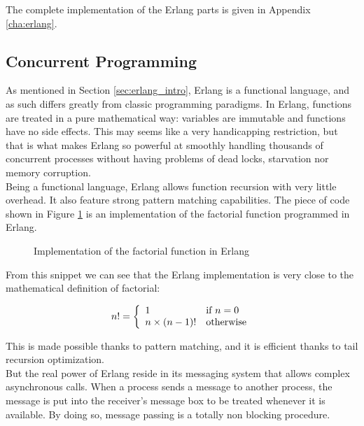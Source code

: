 The complete implementation of the Erlang parts is given in Appendix \ref{cha:erlang}.

\subsection{Concurrent Programming}

As mentioned in Section \ref{sec:erlang_intro}, Erlang is a functional language, and as such differs greatly from classic programming paradigms. In Erlang, functions are treated in a pure mathematical way: variables are immutable and functions have no side effects. This may seems like a very handicapping restriction, but that is what makes Erlang so powerful at smoothly handling thousands of concurrent processes without having problems of dead locks, starvation nor memory corruption.\\

Being a functional language, Erlang allows function recursion with very little overhead. It also feature strong pattern matching capabilities. The piece of code shown in Figure \ref{fig:erlang_factorial} is an implementation of the factorial function programmed in Erlang.\\

\begin{figure}[ht]
  \centering
  \caption{Implementation of the factorial function in Erlang}
  \label{fig:erlang_factorial}
\end{figure}

From this snippet we can see that the Erlang implementation is very close to the mathematical definition of factorial:

 \[n! = 
            \left\{
              \begin{array}{l l}
                   1 & \textrm{if } n = 0\\
                   n \times (n - 1)! & \textrm{otherwise}
               \end{array}
            \right.
\] 

This is made possible thanks to pattern matching, and it is efficient thanks to tail recursion optimization.\\

But the real power of Erlang reside in its messaging system that allows complex asynchronous calls. When a process sends a message to another process, the message is put into the receiver's message box to be treated whenever it is available. By doing so, message passing is a totally non blocking procedure.\\

